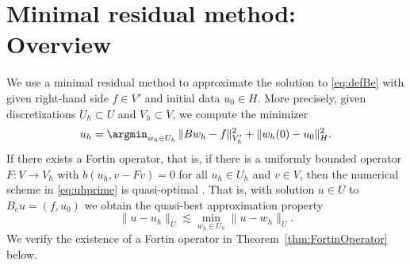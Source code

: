 \documentclass{amsart}
\begin{document}
\section{Minimal residual method: Overview}\label{subsec:discreteSetting}
We use a minimal residual method to approximate the solution to \eqref{eq:defBe} with given right-hand side $f\in V'$ and initial data $u_0 \in H$. 
More precisely, given discretizations $U_h \subset U$ and $V_h \subset V$, we compute the minimizer
\begin{equation}\label{eq:uhprime}
u_h = \argmin_{w_h \in U_h}\, \lVert B w_h - f\rVert_{V_h'}^2  + \lVert w_h(0) - u_0\rVert_{H}^2.
\end{equation}
If there exists a Fortin operator, that is, if there is a uniformly bounded operator $F\colon V \to V_h$ with $b(u_h,v-Fv) = 0$ for all $u_h \in U_h$ and $v \in V$, then the numerical scheme in \eqref{eq:uhprime} is quasi-optimal \cite[Lem.~3.2 as well as Thm.~3.3 and 3.6]{MonsuurStevensonStorn23}. That is, with solution $u\in U$ to $B_e u = (f,u_0)$ we obtain the quasi-best approximation property
\begin{equation}\label{eq:QuasiBest}
\lVert u-u_h \rVert_U \lesssim \min_{w_h \in U_h} \lVert u- w_h \rVert_U.
\end{equation}
%
We verify the existence of a Fortin operator in Theorem~\ref{thm:FortinOperator} below.
\end{document}
